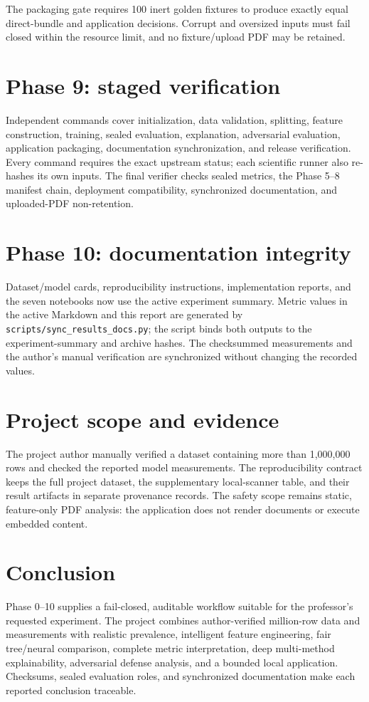 \documentclass[11pt,a4paper]{article}
\begin{document}
The packaging gate requires 100 inert golden fixtures to produce exactly equal
direct-bundle and application decisions. Corrupt and oversized inputs must fail
closed within the resource limit, and no fixture/upload PDF may be retained.

\section{Phase 9: staged verification}

Independent commands cover initialization, data validation, splitting, feature
construction, training, sealed evaluation, explanation, adversarial evaluation,
application packaging, documentation synchronization, and release verification.
Every command requires the exact upstream status; each scientific runner also
re-hashes its own inputs. The final verifier checks sealed metrics, the Phase
5--8 manifest chain, deployment compatibility, synchronized documentation, and
uploaded-PDF non-retention.

\section{Phase 10: documentation integrity}

Dataset/model cards, reproducibility instructions, implementation reports, and
the seven notebooks now use the active experiment summary. Metric values in the
active Markdown and this report are generated by
\texttt{scripts/sync\_results\_docs.py}; the script binds both outputs to the
experiment-summary and archive hashes. The checksummed measurements and the
author's manual verification are synchronized without changing the recorded
values.

\section{Project scope and evidence}

The project author manually verified a dataset containing more than 1,000,000
rows and checked the reported model measurements. The reproducibility contract
keeps the full project dataset, the supplementary local-scanner table, and their
result artifacts in separate provenance records. The safety scope remains static,
feature-only PDF analysis: the application does not render documents or execute
embedded content.

\section{Conclusion}

Phase 0--10 supplies a fail-closed, auditable workflow suitable for the
professor's requested experiment. The project combines author-verified
million-row data and measurements with realistic prevalence, intelligent feature
engineering, fair tree/neural comparison, complete metric interpretation, deep
multi-method explainability, adversarial defense analysis, and a bounded local
application. Checksums, sealed evaluation roles, and synchronized documentation
make each reported conclusion traceable.



\end{document}
